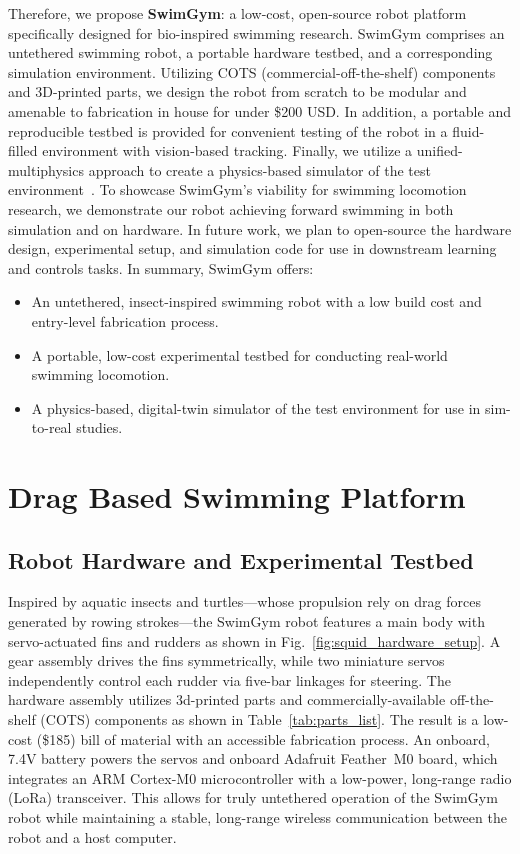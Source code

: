 Therefore, we propose \textbf{SwimGym}: a low-cost, open-source robot platform specifically designed for bio-inspired swimming research. SwimGym comprises an untethered swimming robot, a portable hardware testbed, and a corresponding simulation environment. Utilizing COTS (commercial-off-the-shelf) components and 3D-printed parts, we design the robot from scratch to be modular and amenable to fabrication in house for under \$200 USD. In addition, a portable and reproducible testbed is provided for convenient testing of the robot in a fluid-filled environment with vision-based tracking. Finally, we utilize a unified-multiphysics approach to create a physics-based simulator of the test environment~\cite{lee2025unifiedframeworksimulatingstronglycoupled}. To showcase SwimGym's viability for swimming locomotion research, we demonstrate our robot achieving forward swimming in both simulation and on hardware. In future work, we plan to open-source the hardware design, experimental setup, and simulation code for use in downstream learning and controls tasks. In summary, SwimGym offers:
\begin{itemize}
    \item An untethered, insect-inspired swimming robot with a low build cost and entry-level fabrication process.
    \item A portable, low-cost experimental testbed for conducting real-world swimming locomotion.
    \item A physics-based, digital-twin simulator of the test environment for use in sim-to-real studies.
\end{itemize}
 
 
\section{Drag Based Swimming Platform}
 
\subsection{Robot Hardware and Experimental Testbed}
 
Inspired by aquatic insects and turtles---whose propulsion rely on drag forces generated by rowing strokes---the SwimGym robot features a main body with servo-actuated fins and rudders as shown in Fig.~\ref{fig:squid_hardware_setup}. A gear assembly drives the fins symmetrically, while two miniature servos independently control each rudder via five-bar linkages for steering. The hardware assembly utilizes 3d-printed parts and commercially-available off-the-shelf (COTS) components as shown in Table~\ref{tab:parts_list}. The result is a low-cost (\$185) bill of material with an accessible fabrication process. An onboard, 7.4V battery powers the servos and onboard Adafruit Feather~M0 board, which integrates an ARM Cortex-M0 microcontroller with a low-power, long-range radio (LoRa) transceiver. This allows for truly untethered operation of the SwimGym robot while maintaining a stable, long-range wireless communication between the robot and a host computer.
 
